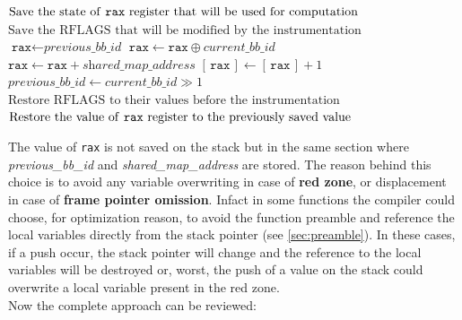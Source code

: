 \begin{algorithm}[ht]
    \caption{Pseudo-code of Shared Memory update instrumentation}
    \label{alg:shm_update}
    \begin{algorithmic}[1]
        \STATE $\text{Save the state of \texttt{rax} register that will be used for computation}$
        \STATE $\text{Save the RFLAGS that will be modified by the instrumentation}$
        \STATE $\texttt{rax} \gets \textit{previous\_bb\_id}$
        \STATE $\texttt{rax} \gets \texttt{rax} \oplus \textit{current\_bb\_id}$ 
        \STATE $\texttt{rax} \gets \texttt{rax} + \textit{shared\_map\_address} $\COMMENT{\small \textcolor{green!60!black}{since the shared map is an array, the offset is obtained by adding the initial address to the index}}
        \STATE $[\,\texttt{rax}\,] \gets [\,\texttt{rax}\,] + 1$ \COMMENT{\small \textcolor{green!60!black}{the [\,\,] is the dereference operator}}
        \STATE $\textit{previous\_bb\_id} \gets \textit{current\_bb\_id} \gg 1$
        \STATE $\text{Restore RFLAGS to their values before the instrumentation}$
        \STATE $\text{Restore the value of \texttt{rax} register to the previously saved value}$
    \end{algorithmic}
\end{algorithm}
The value of \texttt{rax} is not saved on the stack but in the same section where \textit{previous\_bb\_id} and 
\textit{shared\_map\_address} are stored.
The reason behind this choice is to avoid any variable overwriting in case of \textbf{red zone}, or displacement in case 
of \textbf{frame pointer omission}.
Infact in some functions the compiler could choose, for optimization reason, to avoid the function preamble and reference the 
local variables directly from the stack pointer (see \cref{sec:preamble}).
In these cases, if a push occur, the stack pointer will change and the reference to the local variables will be destroyed  
or, worst, the push of a value on the stack could overwrite a local variable present in the red zone.\\
Now the complete approach can be reviewed: 
